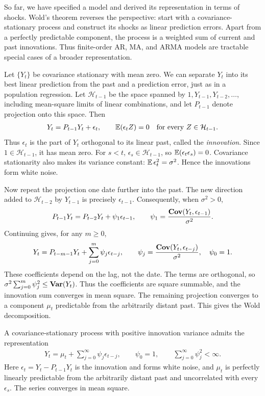 \documentclass[a4paper,12pt]{article}
\begin{document}
So far, we have specified a model and derived its representation in terms of shocks.
Wold's theorem reverses the perspective: start with a covariance-stationary process
and construct its shocks as linear prediction errors.
Apart from a perfectly predictable component, the process is a weighted sum of current and past innovations.
Thus finite-order AR, MA, and ARMA models are tractable special cases of a broader representation.

Let $\{Y_t\}$ be covariance stationary with mean zero.
We can separate $Y_t$ into its best linear prediction from the past and a prediction error,
just as in a population regression.
Let $\mathcal H_{t-1}$ be the space spanned by $1,Y_{t-1},Y_{t-2},\ldots$,
including mean-square limits of linear combinations, and let $P_{t-1}$ denote projection onto this space.
Then
\begin{align}
	Y_t=P_{t-1}Y_t+\epsilon_t,\qquad
	\operatorname{\mathbb{E}}(\epsilon_t Z)=0\quad\text{for every }Z\in\mathcal H_{t-1}.
\end{align}
Thus $\epsilon_t$ is the part of $Y_t$ orthogonal to its linear past, called the \emph{innovation}.
Since $1\in\mathcal H_{t-1}$, it has mean zero.
For $s<t$, $\epsilon_s\in\mathcal H_{t-1}$, so $\operatorname{\mathbb{E}}(\epsilon_t\epsilon_s)=0$.
Covariance stationarity also makes its variance constant: $\operatorname{\mathbb{E}}\epsilon_t^2=\sigma^2$.
Hence the innovations form white noise.

Now repeat the projection one date further into the past.
The new direction added to $\mathcal H_{t-2}$ by $Y_{t-1}$ is precisely $\epsilon_{t-1}$.
Consequently, when $\sigma^2>0$,
\begin{align}
	P_{t-1}Y_t=P_{t-2}Y_t+\psi_1\epsilon_{t-1},\qquad
	\psi_1=\frac{\operatorname{\text{\textrm{\upshape\textbf{Cov}}}}(Y_t,\epsilon_{t-1})}{\sigma^2}.
\end{align}
Continuing gives, for any $m\ge0$,
\begin{align}
	Y_t=P_{t-m-1}Y_t+\sum_{j=0}^{m}\psi_j\epsilon_{t-j},\qquad
	\psi_j=\frac{\operatorname{\text{\textrm{\upshape\textbf{Cov}}}}(Y_t,\epsilon_{t-j})}{\sigma^2},\quad \psi_0=1.
\end{align}
These coefficients depend on the lag, not the date.
The terms are orthogonal, so
$\sigma^2\sum_{j=0}^{m}\psi_j^2\le\operatorname{\text{\textrm{\upshape\textbf{Var}}}}(Y_t)$.
Thus the coefficients are square summable, and the innovation sum converges in mean square.
The remaining projection converges to a component $\mu_t$ predictable from the arbitrarily distant past.
This gives the Wold decomposition.

\begin{theorem}\label{thm-wold}
	A covariance-stationary process with positive innovation variance admits the representation
	\begin{align}
		Y_t=\mu_t+\sum_{j=0}^{\infty}\psi_j\epsilon_{t-j},\qquad
		\psi_0=1,\qquad \sum_{j=0}^{\infty}\psi_j^2<\infty.
	\end{align}
	Here $\epsilon_t=Y_t-P_{t-1}Y_t$ is the innovation and forms white noise,
	and $\mu_t$ is perfectly linearly predictable
	from the arbitrarily distant past and uncorrelated with every $\epsilon_s$.
	The series converges in mean square.
\end{theorem}
\end{document}
